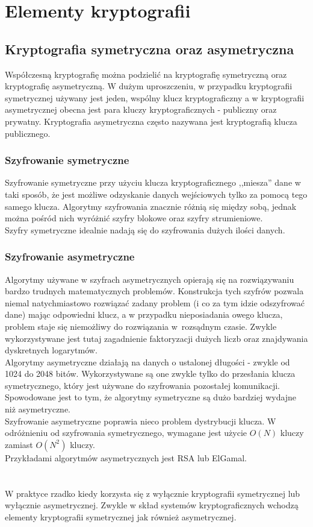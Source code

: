 \chapter{Elementy kryptografii}

\section{Kryptografia symetryczna oraz asymetryczna}
Współczesną kryptografię można podzielić na kryptografię symetryczną oraz kryptografię asymetryczną. 
W dużym uproszczeniu, w przypadku kryptografii symetrycznej używany jest jeden, wspólny klucz kryptograficzny a w kryptografii asymetrycznej obecna jest para kluczy kryptograficznych - publiczny oraz prywatny. Kryptografia asymetryczna często nazywana jest kryptografią klucza publicznego. 

\subsection{Szyfrowanie symetryczne}
Szyfrowanie symetryczne przy użyciu klucza kryptograficznego ,,miesza'' dane w taki sposób, 
że jest możliwe odzyskanie danych wejściowych tylko za pomocą tego samego klucza. 
Algorytmy szyfrowania znacznie różnią się między sobą, 
jednak można pośród nich wyróżnić szyfry blokowe oraz szyfry strumieniowe. \\
Szyfry symetryczne idealnie nadają się do szyfrowania dużych ilości danych. 

\subsection{Szyfrowanie asymetryczne}
Algorytmy używane w szyfrach asymetrycznych opierają się na rozwiązywaniu bardzo trudnych matematycznych problemów. 
Konstrukcja tych szyfrów pozwala niemal natychmiastowo rozwiązać zadany problem (i co za tym idzie odszyfrować dane) mając odpowiedni klucz, a w przypadku nieposiadania owego klucza, problem staje się niemożliwy do rozwiązania w~rozsądnym czasie.
Zwykle wykorzystywane jest tutaj zagadnienie faktoryzacji dużych liczb oraz znajdywania dyskretnych logarytmów. \\
Algorytmy asymetryczne działają na danych o ustalonej długości - zwykle od 1024 do 2048 bitów. Wykorzystywane są one zwykle tylko do przesłania klucza symetrycznego, który jest używane do szyfrowania pozostałej komunikacji. 
Spowodowane jest to tym, że algorytmy symetryczne są dużo bardziej wydajne niż asymetryczne. \\
Szyfrowanie asymetryczne poprawia nieco problem dystrybucji klucza. W odróżnieniu od szyfrowania symetrycznego, wymagane jest użycie $O(N)$ kluczy zamiast $O(N^2)$ \mbox{kluczy}. \\ 
Przykładami algorytmów asymetrycznych jest RSA lub ElGamal. \\ \\ \\
W praktyce rzadko kiedy korzysta się z wyłącznie kryptografii symetrycznej lub wyłącznie asymetrycznej. Zwykle w skład systemów kryptograficznych wchodzą elementy kryptografii symetrycznej jak również asymetrycznej.

